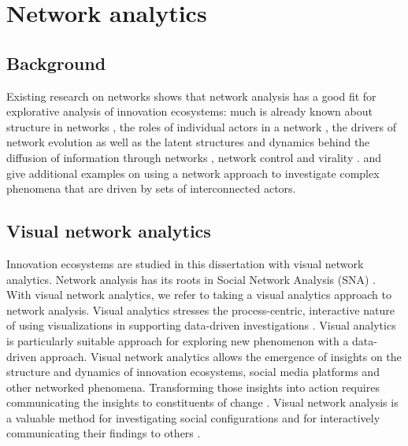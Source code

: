 \chapter{Network analytics}
\label{ch:networkanalytics}

\section{Background}

Existing research on networks shows that network analysis has a good fit for explorative analysis of innovation ecosystems: much is already known about structure in networks \citep{Barabasi2003,Granovetter1973,Watts1998,Watts1999}, the roles of individual actors in a network \citep{Hansen2011}, the drivers of network evolution \citep{Giuliani2008} as well as the latent structures and dynamics behind the diffusion of information through networks \citep{Leskovec2009}, network control \citep{Liu2011} and virality \citep{Shakarian2013,Weng2013}. \cite{Moreno1953,Freeman2000,Hansen2009,Hansen2011,Russell2011,Still2014,Basole2012,Ritala2011} and \cite{Ritala2014} give additional examples on using a network approach to investigate complex phenomena that are driven by sets of interconnected actors.

\section{Visual network analytics}

Innovation ecosystems are studied in this dissertation with visual network analytics. Network analysis has its roots in Social Network Analysis (SNA) \citep{Moreno1953,Wasserman1994}. With visual network analytics, we refer to taking a visual analytics \citep{Thomas2006,Heer2012} approach to network analysis. Visual analytics stresses the process-centric, interactive nature of using visualizations in supporting data-driven investigations \citep{Keim2010,Heer2012}. Visual analytics is particularly suitable approach for exploring new phenomenon with a data-driven approach. Visual network analytics allows the emergence of insights on the structure and dynamics of innovation ecosystems, social media platforms and other networked phenomena. Transforming those insights into action requires communicating the insights to constituents of change \citep{Russell2011,Still2014}. Visual network analysis is a valuable method for investigating social configurations and for interactively communicating their findings to others \citep[][]{Freeman2009}.


